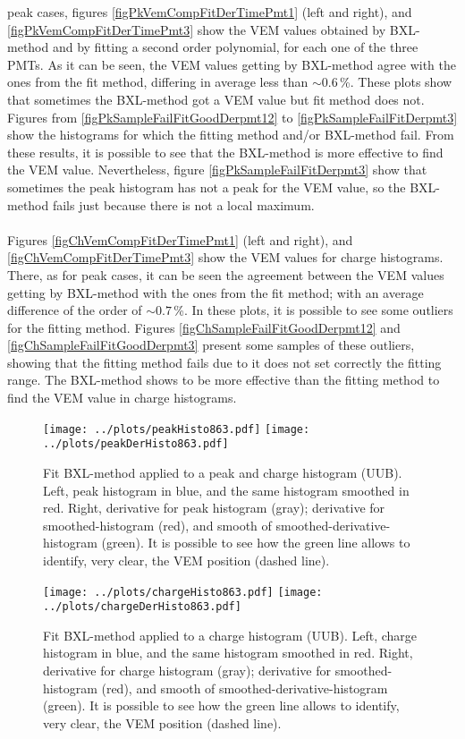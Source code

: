 \documentclass[twoside, final, 10pt]{articleMine}
\begin{document}
peak cases, figures \ref{figPkVemCompFitDerTimePmt1} (left and
right), and \ref{figPkVemCompFitDerTimePmt3} show the VEM values
obtained by BXL-method and by fitting a second order polynomial,
for each one of the three PMTs. As it can be seen, the VEM values
getting by BXL-method agree with the ones from the fit method,
differing in average less than $\sim0.6$\,\%. These plots show
that sometimes the BXL-method got a VEM value but fit method does
not. Figures from \ref{figPkSampleFailFitGoodDerpmt12} to
\ref{figPkSampleFailFitDerpmt3} show the histograms for which the
fitting method and/or BXL-method fail. From these results, it is
possible to see that the BXL-method is more effective to find the
VEM value. Nevertheless, figure \ref{figPkSampleFailFitDerpmt3}
show that sometimes the peak histogram has not a peak for the VEM
value, so the BXL-method fails just because there is not a local
maximum.\\\\Figures \ref{figChVemCompFitDerTimePmt1} (left and
right), and \ref{figChVemCompFitDerTimePmt3} show the VEM values
for charge histograms. There, as for peak cases, it can be seen
the agreement between the VEM values getting by BXL-method with
the ones from the fit method; with an average difference of the
order of $\sim0.7$\,\%. In these plots, it is possible to see
some outliers for the fitting method. Figures
\ref{figChSampleFailFitGoodDerpmt12} and
\ref{figChSampleFailFitGoodDerpmt3} present some samples of these
outliers, showing that the fitting method fails due to it does
not set correctly the fitting range. The BXL-method shows to be
more effective than the fitting method to find the VEM value in
charge histograms.
\clearpage

\begin{figure}[!tbh]
  \centering
  \subfigure
  {
    \texttt{[image: ../plots/peakHisto863.pdf]}
    \texttt{[image: ../plots/peakDerHisto863.pdf]}
  }
  \caption{Fit BXL-method applied to a peak and charge histogram
  (UUB). Left, peak histogram in blue, and the same
  histogram smoothed in red. Right, derivative for peak histogram
  (gray); derivative for smoothed-histogram (red), and smooth of
  smoothed-derivative-histogram (green). It is possible to see
  how the green line allows to identify, very clear, the VEM
  position (dashed line).}
  \label{figBxlMethodPeak}
\end{figure}

\begin{figure}[!tbh]
  \centering
  \subfigure
  {
    \texttt{[image: ../plots/chargeHisto863.pdf]}
    \texttt{[image: ../plots/chargeDerHisto863.pdf]}
  }
  \caption{Fit BXL-method applied to a charge histogram (UUB).
  Left, charge histogram in blue, and the same histogram smoothed
  in red. Right, derivative for charge histogram (gray);
  derivative for smoothed-histogram (red), and smooth of
  smoothed-derivative-histogram (green). It is possible to see
  how the green line allows to identify, very clear, the VEM
  position (dashed line).}
  \label{figBxlMethodCharge}
\end{figure}
\clearpage
\end{document}
